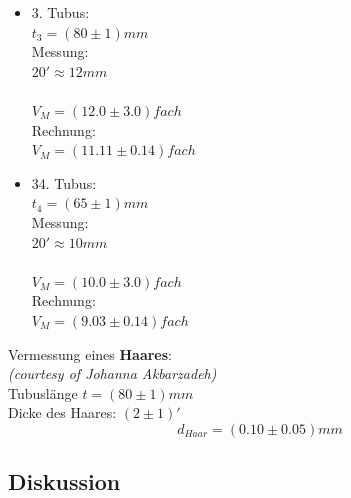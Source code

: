 \documentclass[12pt,a4paper]{article}
\begin{document}
\begin{multicols}{2}
\begin{itemize}
	\item 3. Tubus:\\
	$t_3=(80 \pm 1) mm$\\
	Messung:\\
	$20' \approx 12mm$\\
	\\
	$V_M= (12.0 \pm 3.0)fach$\\
	Rechnung: \\
	$V_M=(11.11 \pm 0.14)fach$
	
	\item 34. Tubus:\\
	$t_4=(65 \pm 1) mm$\\
	Messung:\\
	$20' \approx 10mm$\\
	\\
	$V_M= (10.0 \pm 3.0)fach$\\
	Rechnung: \\
	$V_M=(9.03 \pm 0.14)fach$
	
	
\end{itemize}

\noindent Vermessung eines \textbf{Haares}:\\
\textit{(courtesy of Johanna Akbarzadeh)}\\
Tubuslänge $t= (80 \pm 1)mm$\\
Dicke des Haares: $(2 \pm 1)'$\\
$$d_{Haar} = (0.10 \pm 0.05)mm$$



\subsection{Diskussion}


\end{multicols}
\end{document}
